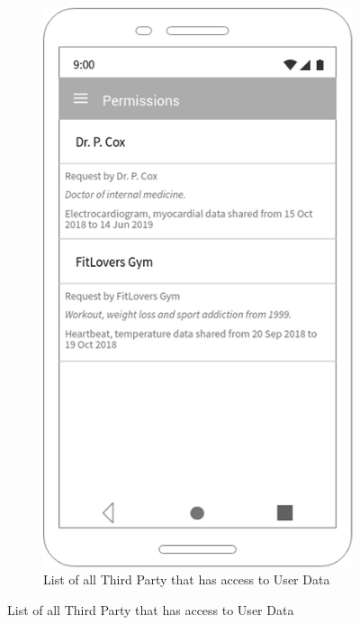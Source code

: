 \begin{figure}[h!]

 \centering

  \begin{subfigure}[b]{0.25\linewidth}

    \includegraphics[width=\linewidth]{img/mockup/u_permissions.jpg}

    \caption{List of all Third Party that has access to User Data}


\end{subfigure}
\end{figure}
